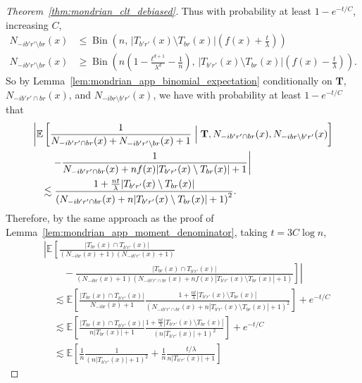\documentclass[11pt,lof]{puthesis}
\newcommand{\E}{\ensuremath{\mathbb{E}}}
\newcommand{\bT}{\ensuremath{\mathbf{T}}}
\DeclareMathOperator{\Bin}{Bin}
\theoremstyle{break}
\theoremstyle{proof}
\newtheorem{proof}{Proof}
\begin{document}
\begin{proof}[Theorem~\ref{thm:mondrian_clt_debiased}]
Thus with probability at least $1 - e^{-t/C}$,
increasing $C$,
%
\begin{align*}
N_{-i b' r' \setminus b r}(x)
&\leq \Bin\left(
n, \,
|T_{b' r'}(x) \setminus T_{b r}(x)|
\left( f(x) + \frac{t}{\lambda} \right)
\right) \\
N_{-i b' r' \setminus b r}(x)
&\geq
\Bin\left(
n
\left( 1 - \frac{t^{d+1}}{\lambda^d}
- \frac{1}{n} \right), \,
|T_{b' r'}(x) \setminus T_{b r}(x)|
\left( f(x) - \frac{t}{\lambda} \right)
\right).
\end{align*}
%
So by Lemma~\ref{lem:mondrian_app_binomial_expectation} conditionally on
$\bT$, $N_{-i b' r' \cap b r}(x)$, and $N_{-i b r \setminus b' r'}(x)$,
we have with probability at least $1 - e^{-t/C}$ that
%
\begin{align*}
&\left|
\E \left[
\frac{1}
{N_{-i b' r' \cap b r}(x)+N_{-i b' r' \setminus b r}(x)+1}
\Bigm| \bT, N_{-i b' r' \cap b r}(x), N_{-i b r \setminus b' r'}(x)
\right]
\right.
\\
&\left.
\qquad-
\frac{1}
{N_{-i b' r' \cap b r}(x) + n f(x) |T_{b' r'}(x) \setminus T_{b r}(x)|+1}
\right| \\
&\quad\lesssim
\frac{1 + \frac{n t}{\lambda} |T_{b' r'}(x) \setminus T_{b r}(x)|}
{\left(N_{-i b' r' \cap b r}(x)
+ n |T_{b' r'}(x) \setminus T_{b r}(x)|+1\right)^2}.
\end{align*}
%
Therefore, by the same approach as the proof of
Lemma~\ref{lem:mondrian_app_moment_denominator},
taking $t = 3 C \log n$,
%
\begin{align*}
&
\left|
\E \left[
\frac{|T_{b r}(x) \cap T_{b' r'}(x)|}
{(N_{-i b r}(x)+1) (N_{-i b' r'}(x)+1)}
\right.\right. \\
&\left.\left.
\qquad -
\frac{|T_{b r}(x) \cap T_{b' r'}(x)|}
{(N_{-i b r}(x)+1)
(N_{-i b' r' \cap b r}(x)+n f(x)
|T_{b' r'}(x) \setminus T_{b r}(x)|+1)}
\right]
\right| \\
&\quad\lesssim
\E \left[
\frac{|T_{b r}(x) \cap T_{b' r'}(x)|}{N_{-i b r}(x)+1}
\frac{1 + \frac{n t}{\lambda} |T_{b' r'}(x) \setminus T_{b r}(x)|}
{\left(N_{-i b' r' \cap b r}(x)
+ n |T_{b' r'}(x) \setminus T_{b r}(x)|+1\right)^2}
\right]
+
e^{-t/C} \\
&\quad\lesssim
\E \left[
\frac{|T_{b r}(x) \cap T_{b' r'}(x)|}
{n |T_{b r}(x)|+1}
\frac{1 + \frac{n t}{\lambda} |T_{b' r'}(x) \setminus T_{b r}(x)|}
{(n |T_{b' r'}(x)| + 1)^2}
\right]
+ e^{-t/C} \\
&\quad\lesssim
\E \left[
\frac{1}{n}
\frac{1}
{(n |T_{b' r'}(x)| + 1)^2}
+ \frac{1}{n}
\frac{t / \lambda}
{n |T_{b' r'}(x)| + 1}
\right]

\end{align*}
\end{proof}
\end{document}
